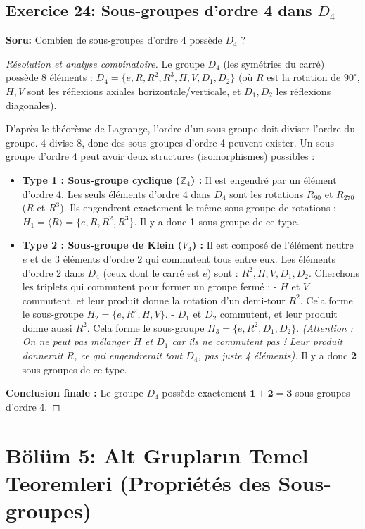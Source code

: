 \documentclass[12pt,a4paper]{report}
\begin{document}
\subsection*{Exercice 24: Sous-groupes d'ordre 4 dans $D_4$}
\textbf{Soru:} Combien de sous-groupes d'ordre 4 possède $D_4$ ?
\begin{proof}[Résolution et analyse combinatoire]
Le groupe $D_4$ (les symétries du carré) possède 8 éléments : 
$D_4 = \{ e, R, R^2, R^3, H, V, D_1, D_2 \}$ 
(où $R$ est la rotation de $90^\circ$, $H, V$ sont les réflexions axiales horizontale/verticale, et $D_1, D_2$ les réflexions diagonales).

D'après le théorème de Lagrange, l'ordre d'un sous-groupe doit diviser l'ordre du groupe. $4$ divise $8$, donc des sous-groupes d'ordre 4 peuvent exister.
Un sous-groupe d'ordre 4 peut avoir deux structures (isomorphismes) possibles :
\begin{itemize}
    \item \textbf{Type 1 : Sous-groupe cyclique ($\mathbb{Z}_4$) :} Il est engendré par un élément d'ordre 4. 
    Les seuls éléments d'ordre 4 dans $D_4$ sont les rotations $R_{90}$ et $R_{270}$ ($R$ et $R^3$). 
    Ils engendrent exactement le même sous-groupe de rotations : $H_1 = \langle R \rangle = \{e, R, R^2, R^3\}$.
    Il y a donc \textbf{1} sous-groupe de ce type.
    
    \item \textbf{Type 2 : Sous-groupe de Klein ($V_4$) :} Il est composé de l'élément neutre $e$ et de 3 éléments d'ordre 2 qui commutent tous entre eux.
    Les éléments d'ordre 2 dans $D_4$ (ceux dont le carré est $e$) sont : $R^2, H, V, D_1, D_2$.
    Cherchons les triplets qui commutent pour former un groupe fermé :
    - $H$ et $V$ commutent, et leur produit donne la rotation d'un demi-tour $R^2$. Cela forme le sous-groupe $H_2 = \{e, R^2, H, V\}$.
    - $D_1$ et $D_2$ commutent, et leur produit donne aussi $R^2$. Cela forme le sous-groupe $H_3 = \{e, R^2, D_1, D_2\}$.
    \textit{(Attention : On ne peut pas mélanger $H$ et $D_1$ car ils ne commutent pas ! Leur produit donnerait $R$, ce qui engendrerait tout $D_4$, pas juste 4 éléments).}
    Il y a donc \textbf{2} sous-groupes de ce type.
\end{itemize}
\textbf{Conclusion finale :} Le groupe $D_4$ possède exactement $\mathbf{1 + 2 = 3}$ sous-groupes d'ordre 4.
\end{proof}
\section{Bölüm 5: Alt Grupların Temel Teoremleri (Propriétés des Sous-groupes)}
\end{document}
